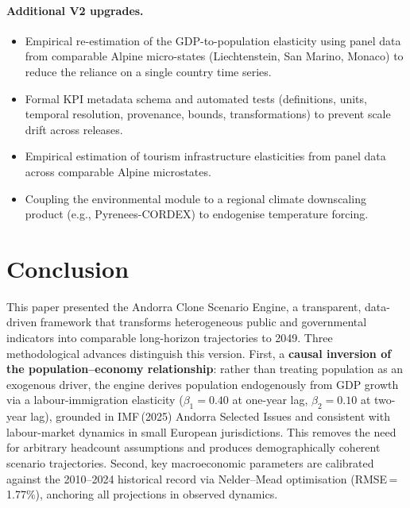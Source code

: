 \documentclass{article}
\begin{document}
\paragraph{Additional V2 upgrades.}
\begin{itemize}
    \item Empirical re-estimation of the GDP-to-population elasticity using
          panel data from comparable Alpine micro-states (Liechtenstein, San
          Marino, Monaco) to reduce the reliance on a single country time series.
    \item Formal KPI metadata schema and automated tests (definitions, units,
          temporal resolution, provenance, bounds, transformations) to prevent
          scale drift across releases.
    \item Empirical estimation of tourism infrastructure elasticities from panel
          data across comparable Alpine microstates.
    \item Coupling the environmental module to a regional climate downscaling
          product (e.g., Pyrenees-CORDEX) to endogenise temperature forcing.
\end{itemize}

\section{Conclusion}

This paper presented the Andorra Clone Scenario Engine, a transparent,
data-driven framework that transforms heterogeneous public and governmental
indicators into comparable long-horizon trajectories to 2049. Three
methodological advances distinguish this version. First, a
\textbf{causal inversion of the population--economy relationship}: rather than
treating population as an exogenous driver, the engine derives population
endogenously from GDP growth via a labour-immigration elasticity
($\beta_1=0.40$ at one-year lag, $\beta_2=0.10$ at two-year lag), grounded in
IMF\,(2025) Andorra Selected Issues and consistent with labour-market dynamics
in small European jurisdictions. This removes the need for arbitrary headcount
assumptions and produces demographically coherent scenario trajectories.
Second, key macroeconomic parameters are calibrated against the 2010--2024
historical record via Nelder--Mead optimisation (RMSE\,=\,1.77\%), anchoring
all projections in observed dynamics.
\end{document}
